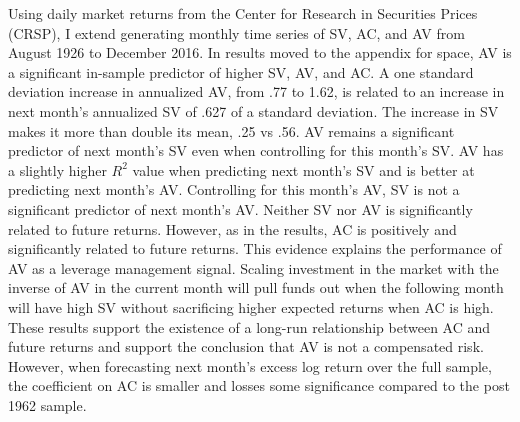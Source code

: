 Using daily market returns from the Center for Research in Securities Prices (CRSP), I extend \citet{pollet_average_2010} generating monthly time series of SV, AC, and AV from August 1926 to December 2016. In results moved to the appendix for space, AV is a significant in-sample predictor of higher SV, AV, and AC.  A one standard deviation increase in annualized AV, from .77 to 1.62, is related to an increase in next month’s annualized SV of .627 of a standard deviation. The increase in SV makes it more than double its mean, .25 vs .56. AV remains a significant predictor of next month’s SV even when controlling for this month's SV. AV has a slightly higher $R^{2}$ value when predicting next month's SV and is better at predicting next month's AV. Controlling for this month's AV, SV is not a significant predictor of next month's AV. Neither SV nor AV is significantly related to future returns. However, as in the \citet{pollet_average_2010} results, AC is positively and significantly related to future returns. %
This evidence explains the performance of AV as a leverage management signal. Scaling investment in the market with the inverse of AV in the current month will pull funds out when the following month will have high SV without sacrificing higher expected returns when AC is high. 
These results support the existence of a long-run relationship between AC and future returns and support the conclusion that AV is not a compensated risk. However, when forecasting next month's excess log return over the full sample, the coefficient on AC is smaller and losses some significance compared to the post 1962 sample. 

